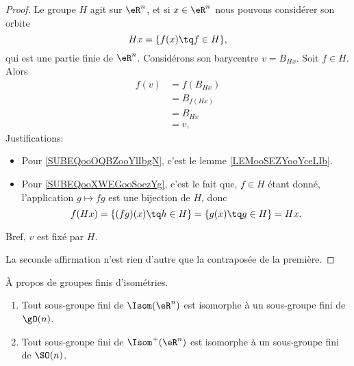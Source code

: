 \begin{proof}
	Le groupe \( H\) agit sur \( \eR^n\), et si \( x\in \eR^n\) nous pouvons considérer son orbite
	\begin{equation}
		Hx=\{f(x)\tq f\in H\},
	\end{equation}
	qui est une partie finie de \( \eR^n\). Considérons son barycentre $v=B_{Hx}$. Soit \( f\in H\). Alors
	\begin{subequations}
		\begin{align}
			f(v) & =f(B_{Hx})                                 \\
			     & =B_{f(Hx)}     \label{SUBEQooOQBZooYlIbgN} \\
			     & =B_{Hx}        \label{SUBEQooXWEGooSoezYg} \\
			     & =v,
		\end{align}
	\end{subequations}
	Justifications:
	\begin{itemize}
		\item Pour \eqref{SUBEQooOQBZooYlIbgN}, c'est le lemme \ref{LEMooSEZYooYceLIb}.
		\item Pour \eqref{SUBEQooXWEGooSoezYg}, c'est le fait que, \( f\in H\) étant donné, l'application \( g\mapsto fg\) est une bijection de \( H\), donc
		      \begin{equation}
			      f(Hx)=\{(fg)(x)\tq h\in H\}=\{g(x)\tq g\in H\}=Hx.
		      \end{equation}
	\end{itemize}
	Bref, \( v\) est fixé par \( H\).

	La seconde affirmation n'est rien d'autre que la contraposée de la première.
\end{proof}

\begin{proposition}     \label{PROPooEUFIooDUIYzi}
	À propos de groupes finis d'isométries.
	\begin{enumerate}
		\item
		      Tout sous-groupe fini de \( \Isom(\eR^n)\) est isomorphe à un sous-groupe fini de \( \gO(n)\).
		\item
		      Tout sous-groupe fini de \( \Isom^+(\eR^n)\) est isomorphe à un sous-groupe fini de \( \SO(n)\).
	\end{enumerate}
\end{proposition}

